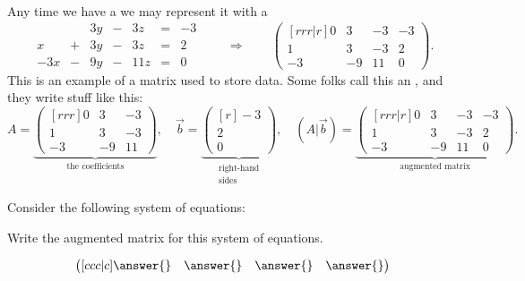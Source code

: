 \documentclass{ximera}
\begin{document}
Any time we have a  we may represent it with a
\[
  \begin{array}{rcrcrcr}
         &    & 3y  & -  & 3z   & =  & -3 \\
    x    & +  & 3y  & -  & 3z   & =  & 2 \\
    -3x  & -  & 9y  & -  & 11z  & =  & 0
  \end{array}
  \qquad\Longrightarrow\qquad
  \begin{pmatrix}[rrr|r]
    0 &   3 & -3 & -3 \\
    1 &   3 & -3 & 2  \\
    -3& -9  & 11 & 0
  \end{pmatrix}.
\]
This is an example of a matrix used to store data. Some folks call
this an , and they write stuff like this:
\[
A = \underbrace{\begin{pmatrix}[rrr]
  0 & 3 & -3  \\
  1 &  3  & -3 \\
 -3 & -9 & 11
\end{pmatrix}}_{\text{the coefficients}},
\quad
\vec{b} =
\underbrace{\begin{pmatrix}[r]
 -3\\ 2 \\ 0
\end{pmatrix}}_{\begin{smallmatrix}\text{right-hand} \\
  \text{sides} \end{smallmatrix}},
\quad
\left(A|\vec{b}\right) = \underbrace{\begin{pmatrix}[rrr|r]
  0 &   3 & -3 & -3 \\
  1 &   3 & -3 & 2  \\
  -3& -9  & 11 & 0
\end{pmatrix}}_{\text{augmented matrix}}.
\]

\begin{question}
  Consider the following system of equations:

  Write the augmented matrix for this system of equations.
  \begin{prompt}
    \[
      \begin{pmatrix}[ccc|c]
        \answer{} & \answer{} & \answer{} & \answer{}
      \end{pmatrix}
    \]
  \end{prompt}
\end{question}
\end{document}

